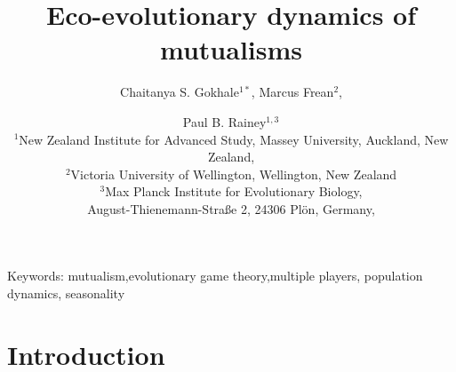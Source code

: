 \documentclass[12pt]{article}
\title{\vspace*{-22mm}\bf Eco-evolutionary dynamics of mutualisms}
\author{Chaitanya S. Gokhale$^{1*}$,
Marcus Frean$^{2}$,
 \and Paul B. Rainey$^{1,3}$ \\
\normalsize $^{1}$New Zealand Institute for Advanced Study, Massey University, Auckland, New Zealand, \\
\normalsize $^2$Victoria University of Wellington, Wellington, New Zealand\\
\normalsize $^3$Max Planck Institute for Evolutionary Biology, \\
\normalsize August-Thienemann-Stra{\ss}e 2, 24306 Pl\"{o}n, Germany,\\
}
\date{}
\newcommand{\paul}[1]{\textcolor{red}{(#1)}}
\begin{document}
\maketitle

\begin{abstract}
\end{abstract}

\noindent
Keywords: mutualism,evolutionary game theory,multiple players, population dynamics, seasonality

\tableofcontents

\section{Introduction}
\end{document}
